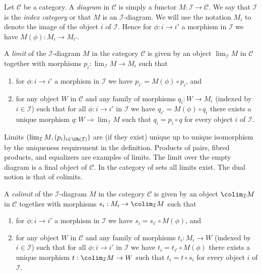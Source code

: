 \noindent
Let $\mathcal{C}$ be a category. A {\it diagram} in $\mathcal{C}$ is
simply a functor $M : \mathcal{I} \to \mathcal{C}$. We say that
$\mathcal{I}$ is the {\it index category} or that $M$ is an
$\mathcal{I}$-diagram. We will use the notation $M_i$ to denote the
image of the object
$i$ of $\mathcal{I}$. Hence for $\phi : i \to i'$ a morphism
in $\mathcal{I}$ we have $M(\phi) : M_i \to M_{i'}$.

\begin{definition}
\label{definition-limit}
A {\it limit} of the $\mathcal{I}$-diagram $M$ in the category
$\mathcal{C}$ is given by an object $\lim_\mathcal{I} M$ in $\mathcal{C}$
together with morphisms $p_i : \lim_\mathcal{I} M \to M_i$ such that
\begin{enumerate}
\item for $\phi : i \to i'$ a morphism
in $\mathcal{I}$ we have $p_{i'} =  M(\phi) \circ p_i$, and
\item for any object $W$ in $\mathcal{C}$ and any family of
morphisms $q_i : W \to M_i$ (indexed by $i \in \mathcal{I}$)
such that for all $\phi : i \to i'$
in $\mathcal{I}$ we have $q_{i'} = M(\phi) \circ q_i$ there
exists a unique morphism $q : W \to \lim_\mathcal{I} M$ such that
$q_i = p_i \circ q$ for every object $i$ of $\mathcal{I}$.
\end{enumerate}
\end{definition}

\noindent
Limits $(\lim_\mathcal{I} M, (p_i)_{i\in \Ob(\mathcal{I})})$ are
(if they exist)
unique up to unique isomorphism by the uniqueness requirement
in the definition. Products of pairs, fibred products, and equalizers are
examples of limits. The limit over the empty diagram is a final object
of $\mathcal{C}$.
In the category of sets all limits exist.
The dual notion is that of colimits.

\begin{definition}
\label{definition-colimit}
A {\it colimit} of the $\mathcal{I}$-diagram $M$ in the category
$\mathcal{C}$ is given by an object $\colim_\mathcal{I} M$ in $\mathcal{C}$
together with morphisms $s_i : M_i \to \colim_\mathcal{I} M$ such that
\begin{enumerate}
\item for $\phi : i \to i'$ a morphism
in $\mathcal{I}$ we have $s_i = s_{i'} \circ M(\phi)$, and
\item for any object $W$ in $\mathcal{C}$ and any family of
morphisms $t_i : M_i \to W$ (indexed by $i \in \mathcal{I}$)
such that for all $\phi : i \to i'$
in $\mathcal{I}$ we have $t_i = t_{i'} \circ M(\phi)$ there
exists a unique morphism $t : \colim_\mathcal{I} M \to W$ such that
$t_i = t \circ s_i$ for every object $i$ of $\mathcal{I}$.
\end{enumerate}
\end{definition}


